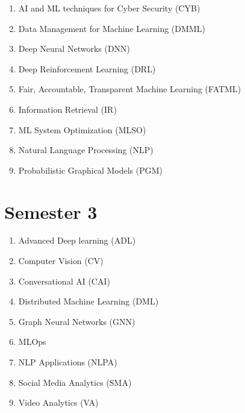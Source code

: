 \begin{enumerate}
    \item AI and ML techniques for Cyber Security (CYB)
    \item Data Management for Machine Learning (DMML)
    \item Deep Neural Networks (DNN)
    \item Deep Reinforcement Learning (DRL)
    \item Fair, Accountable, Transparent Machine Learning (FATML)
    \item Information Retrieval (IR)
    \item ML System Optimization (MLSO)
    \item Natural Language Processing (NLP)
    \item Probabilistic Graphical Models (PGM)
\end{enumerate}


\section*{Semester 3}

\begin{enumerate}
    \item Advanced Deep learning (ADL)
    \item Computer Vision (CV)
    \item Conversational AI (CAI)
    \item Distributed Machine Learning (DML)
    \item Graph Neural Networks (GNN)
    \item MLOps
    \item NLP Applications (NLPA)
    \item Social Media Analytics (SMA)
    \item Video Analytics (VA)
\end{enumerate}







